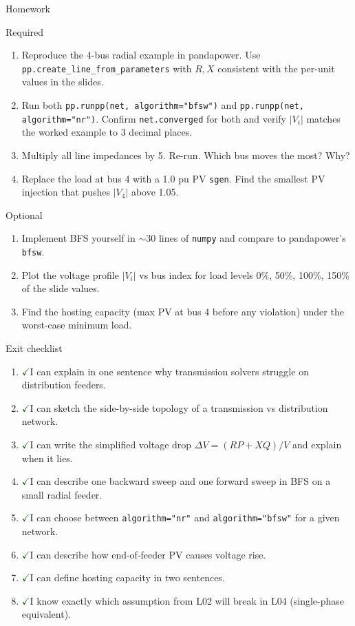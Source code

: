 \documentclass[aspectratio=169,10pt]{beamer}
\newcommand{\code}[1]{\texttt{#1}}
\newcommand{\checkitem}{\textcolor{darkgreen}{\Large$\checkmark$}\;}
\begin{document}
\begin{frame}{Homework}
\begin{block}{Required}
\begin{enumerate}
  \item Reproduce the 4-bus radial example in pandapower. Use \code{pp.create\_line\_from\_parameters} with $R, X$ consistent with the per-unit values in the slides.
  \item Run both \code{pp.runpp(net, algorithm="bfsw")} and \code{pp.runpp(net, algorithm="nr")}. Confirm \code{net.converged} for both and verify $|V_i|$ matches the worked example to 3 decimal places.
  \item Multiply all line impedances by 5. Re-run. Which bus moves the most? Why?
  \item Replace the load at bus 4 with a 1.0 pu PV \code{sgen}. Find the smallest PV injection that pushes $|V_4|$ above 1.05.
\end{enumerate}
\end{block}
\begin{block}{Optional}
\begin{enumerate}
  \item Implement BFS yourself in $\sim$30 lines of \code{numpy} and compare to pandapower's \code{bfsw}.
  \item Plot the voltage profile $|V_i|$ vs bus index for load levels 0\%, 50\%, 100\%, 150\% of the slide values.
  \item Find the hosting capacity (max PV at bus 4 before any violation) under the worst-case minimum load.
\end{enumerate}
\end{block}
\end{frame}

\begin{frame}{Exit checklist}
\begin{enumerate}
  \item \checkitem I can explain in one sentence why transmission solvers struggle on distribution feeders.
  \item \checkitem I can sketch the side-by-side topology of a transmission vs distribution network.
  \item \checkitem I can write the simplified voltage drop $\Delta V = (RP + XQ)/V$ and explain when it lies.
  \item \checkitem I can describe one backward sweep and one forward sweep in BFS on a small radial feeder.
  \item \checkitem I can choose between \code{algorithm="nr"} and \code{algorithm="bfsw"} for a given network.
  \item \checkitem I can describe how end-of-feeder PV causes voltage rise.
  \item \checkitem I can define hosting capacity in two sentences.
  \item \checkitem I know exactly which assumption from L02 will break in L04 (single-phase equivalent).
\end{enumerate}
\end{frame}
\end{document}
